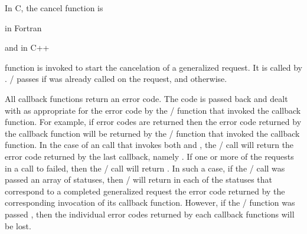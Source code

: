 \medskip
  
In C, the cancel function is


\par\noindent
in Fortran

\medskip


\par\noindent
and in C++

\medskip


 function is invoked to start the cancelation of
a generalized request.
It is called by .
\MPI/ passes  if 
 was already called on the request,
and  otherwise.

All callback functions return an error code.  
The code is passed back and dealt with as appropriate for the error
code by the \MPI/ function that invoked the callback function.  For
example, if error codes are returned then the error code returned by
the callback function will be returned by the \MPI/ function that
invoked the callback function.
In the case of
an 
%
%
 call that invokes both
 and , the \MPI/ call will return
the error code returned by the last callback, namely
.  If one or more of the requests in a call to
%
%
%
%
 failed,
then the \MPI/ call will return
. 
In such a case, if the \MPI/ call was
passed an array of statuses, then \MPI/ will return in each of the
statuses that correspond to a completed generalized request the error
code returned by the corresponding invocation of its 
callback function.  However, if the \MPI/ function was passed
, then the individual error codes
returned by each callback functions will be lost.

